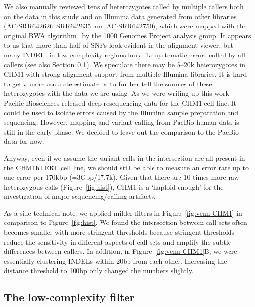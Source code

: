 \documentclass{bioinfo}
\begin{document}
We also manually reviewed tens of heterozygotes called by multiple callers both
on the data in this study and on Illumina data generated from other libraries
(AC:SRR642626--SRR642635 and AC:SRR642750), which were mapped with the original BWA
algorithm~\citep{Li:2009uq} by the 1000 Genomes Project analysis group. It
appears to us that more than half of SNPs look evident in the alignment viewer,
but many INDELs in low-complexity regions look like systematic errors called by
all callers (see also Section~\ref{sec:lc}).  We speculate there may be 5--20k
heterozygotes in CHM1 with strong alignment support from multiple Illumina
libraries. It is hard to get a more accurate estimate or to further tell the
sources of these heterozygotes with the data we are using. As we were writing up
this work, Pacific Biosciences released deep resequencing data for the CHM1
cell line. It could be used to isolate errors caused by the Illumina
sample preparation and sequencing. However, mapping and variant calling from
PacBio human data is still in the early phase. We decided to leave out the comparison
to the PacBio data for now.

Anyway, even if we assume the variant calls in the intersection are all present
in the CHM1hTERT cell line, we should still be able to measure an error rate up
to one error per 170kbp (=3Gbp/17.7k). Given that there are 10 times more raw
heterozygous calls (Figure~\ref{fig:hist}), CHM1 is a `haploid enough' for the
investigation of major sequencing/calling artifacts.

As a side technical note, we applied milder filters in
Figure~\ref{fig:venn-CHM1} in comparison to Figure~\ref{fig:hist}. We found the
intersection between call sets often becomes smaller with more stringent
thresholds because stringent thresholds reduce the sensitivity in different
aspects of call sets and amplify the subtle differences between callers. In
addition, in Figure~\ref{fig:venn-CHM1}B, we were essentially clustering INDELs
within 20bp from each other. Increasing the distance threshold to 100bp only
changed the numbers slightly.

\subsection{The low-complexity filter}\label{sec:lc}
\end{document}
